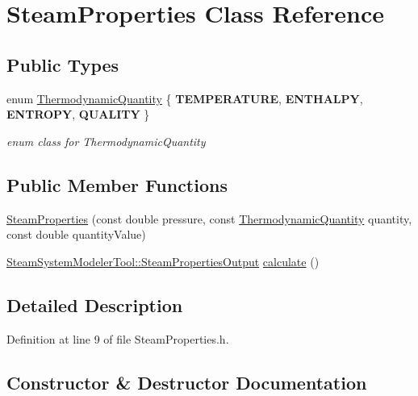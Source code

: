 \hypertarget{class_steam_properties}{}\section{Steam\+Properties Class Reference}
\label{class_steam_properties}
\subsection*{Public Types}
\begin{DoxyCompactItemize}
\item 
\mbox{\label{class_steam_properties_ae0294bedf7d178c2d8fb6aed0f62fbff}} 
enum \hyperlink{class_steam_properties_ae0294bedf7d178c2d8fb6aed0f62fbff}{Thermodynamic\+Quantity} \{ {\bfseries T\+E\+M\+P\+E\+R\+A\+T\+U\+RE}, 
{\bfseries E\+N\+T\+H\+A\+L\+PY}, 
{\bfseries E\+N\+T\+R\+O\+PY}, 
{\bfseries Q\+U\+A\+L\+I\+TY}
 \}\begin{DoxyCompactList}\small\item\em enum class for Thermodynamic\+Quantity \end{DoxyCompactList}
\end{DoxyCompactItemize}
\subsection*{Public Member Functions}
\begin{DoxyCompactItemize}
\item 
\hyperlink{class_steam_properties_a976e08ed0433943d469a8c2f75d2ac68}{Steam\+Properties} (const double pressure, const \hyperlink{class_steam_properties_ae0294bedf7d178c2d8fb6aed0f62fbff}{Thermodynamic\+Quantity} quantity, const double quantity\+Value)
\item 
\hyperlink{struct_steam_system_modeler_tool_1_1_steam_properties_output}{Steam\+System\+Modeler\+Tool\+::\+Steam\+Properties\+Output} \hyperlink{class_steam_properties_a8c729e006c34157435d5476fb31e30b5}{calculate} ()
\end{DoxyCompactItemize}


\subsection{Detailed Description}


Definition at line 9 of file Steam\+Properties.\+h.



\subsection{Constructor \& Destructor Documentation}
\mbox{\label{class_steam_properties_a976e08ed0433943d469a8c2f75d2ac68}} 
